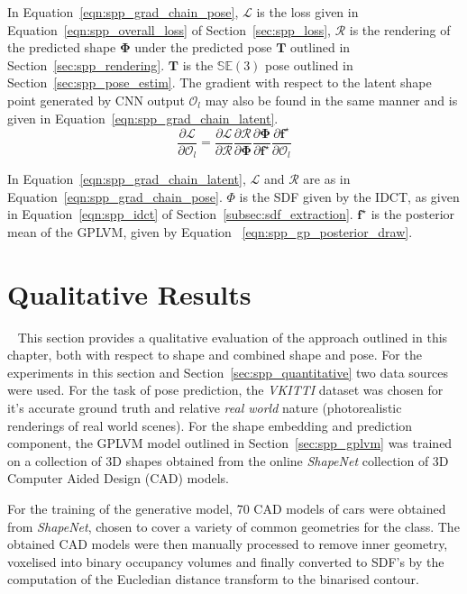 In Equation~\ref{eqn:spp_grad_chain_pose}, \( \mathcal{L} \) is the loss given in Equation~\ref{eqn:spp_overall_loss}
of Section~\ref{sec:spp_loss}, \( \mathcal{R} \) is the rendering of the predicted shape \( \bm{\Phi} \) under the 
predicted pose \( \bm{T} \) outlined in Section~\ref{sec:spp_rendering}. \( \bm{T} \) is the 
\( \mathbb{SE}(3) \) pose outlined in Section~\ref{sec:spp_pose_estim}. The gradient with respect 
to the latent shape point generated by CNN output \( \mathcal{O}_{l} \) may also be found in the same 
manner and is given in Equation~\ref{eqn:spp_grad_chain_latent}.
\begin{equation}
  \label{eqn:spp_grad_chain_latent}
  \frac{\partial \mathcal{L}}{\partial \mathcal{O}_{l}} = 
    \frac{\partial \mathcal{L}}{\partial \mathcal{R}}
    \frac{\partial \mathcal{R}}{\partial \mathcal{\bm{\Phi}}}
    \frac{\partial \bm{\Phi}}{\partial \bm{f}^{\star}}
    \frac{\partial \bm{f}^{\star}}{\partial \mathcal{O}_{l}}
\end{equation}

In Equation~\ref{eqn:spp_grad_chain_latent}, \( \mathcal{L} \) and \( \mathcal{R} \) 
are as in Equation~\ref{eqn:spp_grad_chain_pose}. \( \Phi \) is the SDF given by the IDCT, 
as given in Equation~\ref{eqn:spp_idct} of Section~\ref{subsec:sdf_extraction}. 
\( \bm{f}^{\star} \) is the posterior mean of the GPLVM, given by Equation
~\ref{eqn:spp_gp_posterior_draw}.

\section{Qualitative Results}
~\label{sec:spp_qualitative}
This section provides a qualitative evaluation of the approach outlined in this chapter, both with respect to shape 
and combined shape and pose. For the experiments in this section and Section~\ref{sec:spp_quantitative} two data sources were 
used. For the task of pose prediction, the \textit{VKITTI} dataset was chosen for it's accurate ground truth and relative 
\textit{real world} nature (photorealistic renderings of real world scenes). For the shape embedding and prediction component, 
the GPLVM model outlined in Section~\ref{sec:spp_gplvm} was trained on a collection of 3D shapes obtained from the online 
\textit{ShapeNet} collection of 3D Computer Aided Design (CAD) models\footnotemark. 
~

For the training of the generative model, 70 CAD models of cars were obtained from \textit{ShapeNet}, chosen to cover a variety 
of common geometries for the class. The obtained CAD models were then manually processed to remove inner geometry, voxelised into 
binary occupancy volumes and finally converted to SDF's by the computation of the Eucledian distance transform to the binarised 
contour. 

